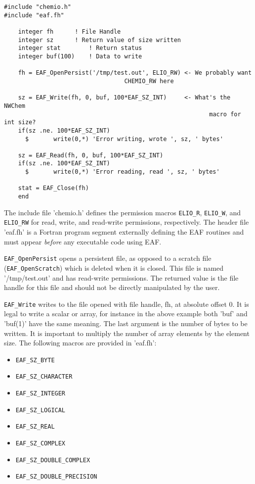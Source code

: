 \begin{verbatim}
#include "chemio.h"
#include "eaf.fh"

	integer fh 		! File Handle
	integer sz 		! Return value of size written
	integer stat		! Return status
	integer buf(100) 	! Data to write

	fh = EAF_OpenPersist('/tmp/test.out', ELIO_RW) <- We probably want
						          CHEMIO_RW here

	sz = EAF_Write(fh, 0, buf, 100*EAF_SZ_INT)     <- What's the NWChem 
                                                          macro for int size?
	if(sz .ne. 100*EAF_SZ_INT) 
      $       write(0,*) 'Error writing, wrote ', sz, ' bytes'

	sz = EAF_Read(fh, 0, buf, 100*EAF_SZ_INT)
	if(sz .ne. 100*EAF_SZ_INT) 
      $       write(0,*) 'Error reading, read ', sz, ' bytes'

	stat = EAF_Close(fh)
	end
\end{verbatim}


The include file 'chemio.h' defines the permission macros {\tt ELIO\_R}, {\tt ELIO\_W}, and
{\tt ELIO\_RW} for read, write, and read-write permissions, respectively.  The
header file 'eaf.fh' is a Fortran program segment externally defining the EAF
routines and must appear {\em before} any executable code using EAF. 

{\tt EAF\_OpenPersist} opens a persistent file, as opposed to a scratch file
({\tt EAF\_OpenScratch}) which is deleted when it is closed.  This file is named
'/tmp/test.out' and has read-write permissions.  The returned value is the
file handle for this file and should not be directly manipulated by the user.

{\tt EAF\_Write} writes to the file opened with file handle, fh, at absolute offset
0.  It is legal to write a scalar or array, for instance in the above 
example both 'buf' and 'buf(1)' have the same meaning.  The last argument is
the number of bytes to be written.  It is important to multiply the number of
array elements by the element size.  The following macros are provided in
'eaf.fh':

\begin{itemize}
\item    {\tt EAF\_SZ\_BYTE}
\item    {\tt EAF\_SZ\_CHARACTER}
\item    {\tt EAF\_SZ\_INTEGER}
\item    {\tt EAF\_SZ\_LOGICAL}
\item    {\tt EAF\_SZ\_REAL}
\item    {\tt EAF\_SZ\_COMPLEX}
\item    {\tt EAF\_SZ\_DOUBLE\_COMPLEX}
\item    {\tt EAF\_SZ\_DOUBLE\_PRECISION}
\end{itemize}


